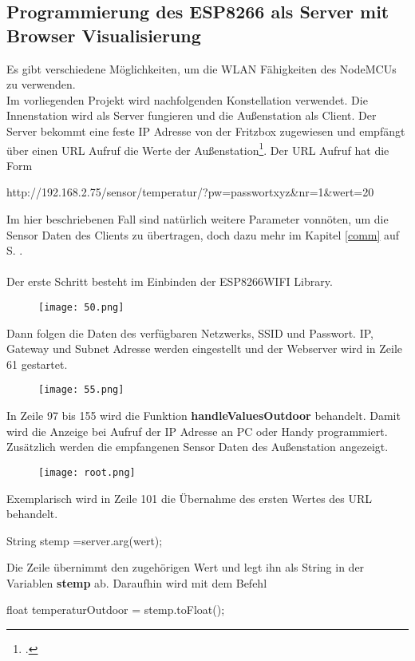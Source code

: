 \documentclass[12pt,a4paper]{scrartcl}	%
\begin{document}
\subsection{Programmierung des ESP8266 als Server mit Browser Visualisierung }
Es gibt verschiedene Möglichkeiten, um die WLAN Fähigkeiten des NodeMCUs zu verwenden. \\
Im vorliegenden Projekt wird nachfolgenden Konstellation verwendet. Die Innenstation wird als Server fungieren und die Außenstation als Client. Der Server bekommt eine feste IP Adresse von der Fritzbox zugewiesen und empfängt über einen URL Aufruf die Werte der Außenstation\footcite[vgl.][Abruf am 30.07.2018]{node}. Der URL Aufruf hat die Form 
\begin{center}
	http://192.168.2.75/sensor/temperatur/?pw=passwortxyz\&nr=1\&wert=20  
\end{center}
Im hier beschriebenen Fall sind natürlich weitere Parameter vonnöten, um die Sensor Daten des Clients zu übertragen, doch dazu mehr im Kapitel \ref{comm} auf S. \pageref{comm}.\\
\\
Der erste Schritt besteht im Einbinden der ESP8266WIFI Library.
\begin{figure}[htb]
	\texttt{[image: 50.png]}
\end{figure}
Dann folgen die Daten des verfügbaren Netzwerks, SSID und Passwort. IP, Gateway und Subnet Adresse werden eingestellt und der Webserver wird in Zeile 61 gestartet.
\begin{figure}[htb]
	\texttt{[image: 55.png]}
\end{figure}
In Zeile 97 bis 155 wird die Funktion \textbf{handleValuesOutdoor} behandelt. Damit wird die Anzeige bei Aufruf der IP Adresse an PC oder Handy programmiert. Zusätzlich werden die empfangenen Sensor Daten des Außenstation angezeigt.
\begin{figure}[htb]
	\texttt{[image: root.png]}
\end{figure}
\clearpage
Exemplarisch wird in Zeile 101 die Übernahme des ersten Wertes des URL behandelt.
\begin{center}
	String stemp =server.arg(\glqq wert\grqq);
\end{center}
Die Zeile übernimmt den zugehörigen Wert und legt ihn als String in der Variablen \textbf{stemp} ab.
Daraufhin wird mit dem Befehl
\begin{center}
	float temperaturOutdoor = stemp.toFloat();
\end{center}
\end{document}
